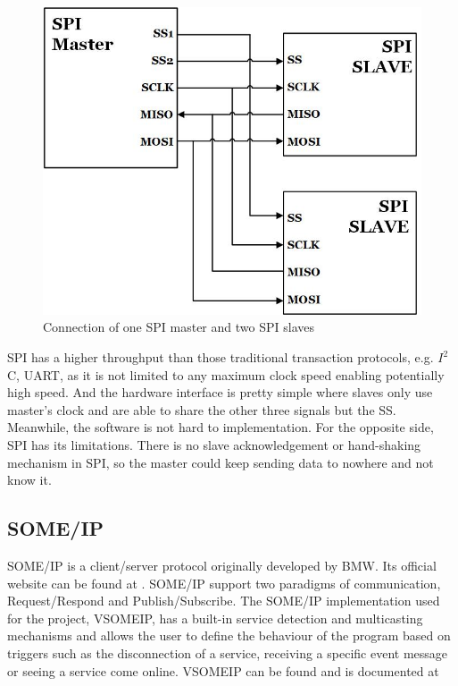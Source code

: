 \documentclass[11pt, titlepage]{article} %
\begin{document}
\begin{figure}[H]
	\centering
   	\includegraphics[scale=0.5]{spi-literature.jpg}
   	\caption{Connection of one SPI master and two SPI slaves}
    \label{fig:spi-literature}
\end{figure}

SPI has a higher throughput than those traditional transaction protocols, e.g. $I^{2}$C, UART, as it is not limited to any maximum clock speed enabling potentially high speed. And the hardware interface is pretty simple where slaves only use master's clock and are able to share the other three signals but the SS. Meanwhile, the software is not hard to implementation. For the opposite side, SPI has its limitations. There is no slave acknowledgement or hand-shaking mechanism in SPI, so the master could keep sending data to nowhere and not know it.

\subsection{SOME/IP}
SOME/IP is a client/server protocol originally developed by BMW. Its official website can be found at \cite{someip}.
SOME/IP support two paradigms of communication, Request/Respond and Publish/Subscribe. The SOME/IP implementation
used for the project, VSOMEIP, has a built-in service detection and multicasting mechanisms and allows the user to
define the behaviour of the program based on triggers such as the disconnection of a service, receiving a specific
event message or seeing a service come online. VSOMEIP can be found and is documented at \cite{vsomeip}
\end{document}
